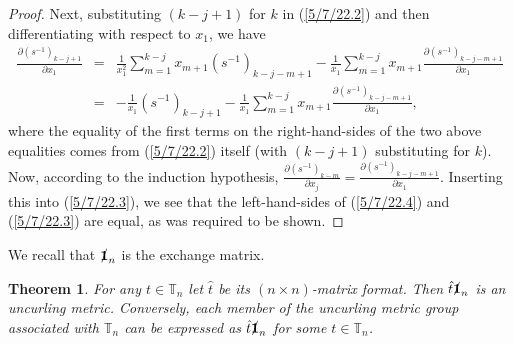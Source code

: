 \documentclass{amsart}
\numberwithin{equation}{section}
\newtheorem{theorem}{Theorem}
\theoremstyle{definition}
\numberwithin{theorem}{section}
\begin{document}
\begin{proof}
Next, substituting $(k-j+1)$ for $k$ in (\ref{5/7/22.2}) and then differentiating with respect to $x_1$, we have   \begin{eqnarray} \nonumber
 \frac{\partial \left( s^{-1} \right)_{k-j+1}}{\partial x_1} &=& \frac{1}{x_1^2} \sum_{m=1}^{k-j} x_{m+1} \left( s^{-1} \right)_{k-j-m+1}    - \frac{1}{x_1} \sum_{m=1}^{k-j} x_{m+1} \frac{\partial \left( s^{-1} \right)_{k-j-m+1}}{\partial x_1}  \\ &=& - \frac{1}{x_1}\left( s^{-1} \right)_{k-j+1}  -  \frac{1}{x_1} \sum_{m=1}^{k-j} x_{m+1} \frac{\partial \left( s^{-1} \right)_{k-j-m+1}}{\partial x_1},\label{5/7/22.3}\end{eqnarray} where the equality of the first terms on the right-hand-sides of the two above equalities comes from (\ref{5/7/22.2}) itself (with $(k-j+1)$ substituting for $k$). 
 Now, according to the induction hypothesis, $\frac{\partial \left( s^{-1} \right)_{k-m}}{\partial x_j} = \frac{\partial \left( s^{-1} \right)_{k-j-m+1}}{\partial x_1}$.  Inserting this into (\ref{5/7/22.3}), we see that the left-hand-sides of (\ref{5/7/22.4}) and (\ref{5/7/22.3}) are equal, as was required to be shown.
 \end{proof} 

We recall that $\slashed{\bf 1}_n$ is the exchange matrix.

\begin{theorem} \label{5/4/22.2} For any $t\in \mathbb{T}_n$ let $\hat{t}$ be its $(n\times n)$-matrix format.    Then $\hat{t} \slashed{\bf 1}_n$ is an uncurling metric.  Conversely, each member of the uncurling metric group associated with $\mathbb{T}_n$ can be expressed as $\hat{t}\slashed{\bf 1}_n$ for some $t\in \mathbb{T}_n$.   \end{theorem}
\end{document}
